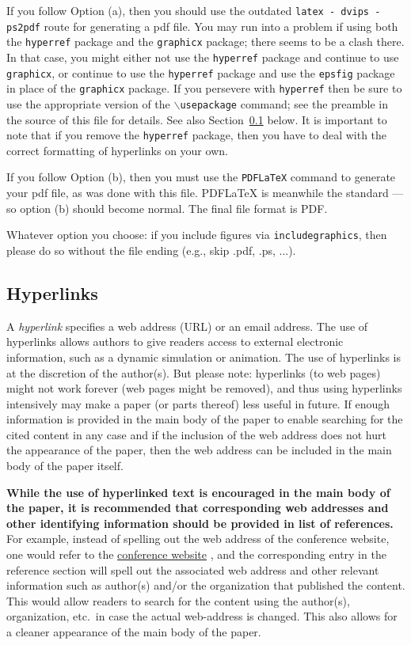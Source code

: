 \documentclass{wscpaperproc}
\theoremstyle{wsc}
\begin{document}
If you follow Option (a), then you should use the outdated {\tt latex - dvips - ps2pdf} route for generating a pdf file. You may run into a problem if using both the {\tt hyperref} package and the {\tt graphicx} package; there seems to be a clash there.
In that case, you might either not use the {\tt hyperref} package and continue to use {\tt graphicx}, or continue to use the {\tt hyperref} package and use the {\tt epsfig} package in place of the {\tt graphicx} package.
If you persevere with {\tt hyperref} then be sure to use the appropriate version of the {\tt $\backslash$usepackage} command; see the preamble in the source of this file for details. See also Section~\ref{sec: hyper} below. It is important to note that if you remove the {\tt hyperref} package, then you have to deal with the correct formatting of hyperlinks on your own.

If you follow Option (b), then you must use the {\tt PDFLaTeX} command to generate your pdf file, as was done with this file. PDFLaTeX is meanwhile the standard --- so option (b) should become normal. The final file format is PDF.

Whatever option you choose: if you include figures via {\tt includegraphics}, then please do so without the file ending (e.g., skip .pdf, .ps, ...).

\subsection{Hyperlinks}
\label{sec: hyper}
A {\em hyperlink} specifies a web address (URL) or an email address.
The use of hyperlinks allows authors to give readers access to external electronic information, such as a dynamic simulation or animation.
The use of hyperlinks is at the discretion of the author(s).
But please note: hyperlinks (to web pages) might not work forever (web pages might be removed), and thus using hyperlinks intensively may make a paper (or parts thereof) less useful in future.
If enough information is provided in the main body of the paper to enable searching for the cited content in any case and if the inclusion of the web address does not hurt the appearance of the paper, then the web address can be included in the main body of the paper itself.

{\bf While the use of hyperlinked text is encouraged in the main body of the paper, it is recommended that corresponding web addresses and other identifying information should be provided in list of references.}
For example, instead of spelling out the web address of the conference website, one would refer to the  \href{http://www.wintersim.org}{conference website} \cite{WSC}, and the corresponding entry in the reference section will spell out the associated web address and other relevant information such as author(s) and/or the organization that published the content.
This would allow readers to search for the content using the author(s), organization, etc.\ in case the actual web-address is changed.  This also allows for a cleaner appearance of the main body of the paper.
\end{document}
